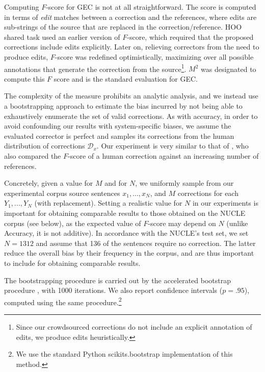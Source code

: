 \documentclass[letter,11pt]{article}
\begin{document}
Computing $F$-score for GEC is not at all straightforward.
The score is computed in terms of {\it edit} matches between a correction and the references,
where edits are sub-strings of the source that are replaced in the correction/reference.
HOO shared task used an earlier version of $F$-score, which required that the proposed corrections include edits explicitly.
Later on, relieving correctors from the need to produce edits, $F$-score was redefined optimistically, maximizing
over all possible annotations that generate the correction from the source\footnote{Since our crowdsourced corrections
	do not include an explicit annotation of edits, we produce edits heuristically.}.
$M^2$ \cite{dahlmeier2012better} was designated to compute this $F$ score and is the standard evaluation for GEC.

The complexity of the measure prohibits an analytic analysis, and
we instead use a bootstrapping approach to estimate the bias incurred
by not being able to exhaustively enumerate the set of valid corrections.
As with accuracy,
in order to avoid confounding our results with system-specific biases,
we assume the evaluated corrector is perfect and samples its corrections from the human distribution of corrections $\mathcal{D}_x$.
Our experiment is very similar to that of ,
who also compared the $F$-score of a human correction against an increasing
number of references.

Concretely, given a value for $M$ and for $N$, we uniformly sample from our experimental
corpus source sentences $x_1,...,x_N$, and $M$ corrections for each $Y_1,...,Y_N$ (with replacement).
Setting a realistic value for $N$ in our experiments is important
for obtaining comparable results to those obtained on the NUCLE corpus (see below), 
as the expected value of $F$-score may depend on $N$ (unlike Accuracy, it is not additive).
In accordance with the NUCLE's test set,
we set $N=1312$ and assume that 136 of the sentences require no correction.
The latter reduce the overall bias by their frequency in the corpus,
and are thus important to include for obtaining comparable results.

The bootstrapping procedure is carried out by the
accelerated bootstrap procedure \cite{efron1987better}, with 1000 iterations.
We also report confidence intervals ($p=.95$), computed using the same procedure.\footnote{We
  use the standard Python scikits.bootstrap implementation of this method.}
%
\end{document}
